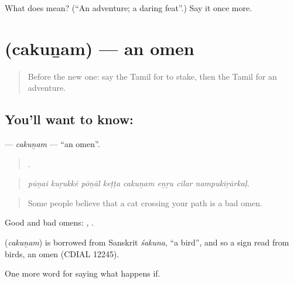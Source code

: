 \begin{tcolorbox}[breakable,colback=teal!4,colframe=teal!35!black,title={Before you move on}]
What does  mean? (\textquotedblleft{}An adventure; a daring feat\textquotedblright{}.) Say it once more.
\end{tcolorbox}
\section[\texorpdfstring{\ta{சகுனம்} (cakuṉam)}{சகுனம் (cakuṉam)}]{ (cakuṉam) — an omen}

\label{lesson:TA-C544-cakunam}



\begin{quote}
Before the new one: say the Tamil for to stake, then the Tamil for an adventure.
\end{quote}

\subsection*{You'll want to know: }
\textbf{} — \emph{cakuṉam} — \textquotedblleft{}an omen\textquotedblright{}.

\begin{quote}
       .
\end{quote}

\begin{quote}
\emph{pūṉai kuṟukkē pōṉāl keṭṭa cakuṉam eṉṟu cilar nampukiṟārkaḷ.}
\end{quote}

\begin{quote}
Some people believe that a cat crossing your path is a bad omen.
\end{quote}

Good and bad omens:  ,  .

\begin{cousinweb}
\textbf{} (\emph{cakuṉam}) is borrowed from Sanskrit \emph{śakuna}, \textquotedblleft{}a bird\textquotedblright{}, and so a sign read from birds, an omen (CDIAL 12245).
\end{cousinweb}

\begin{grammarlens}[title={What you've built}]
One more word for saying what happens if.
\end{grammarlens}

